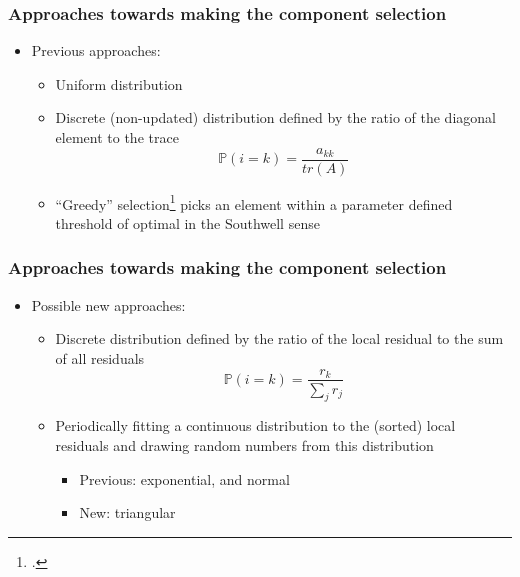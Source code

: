 \documentclass{beamer}
\begin{document}
\begin{frame}
	\frametitle{Approaches towards making the component selection}
	\begin{itemize}
		\item Previous approaches:
		    \begin{itemize}
		        \item Uniform distribution
		        \item Discrete (non-updated) distribution defined by the ratio of the diagonal element to the trace
		            \begin{equation}
		                \mathbb{P}(i=k) = \frac{a_{kk}}{tr(A)}
		            \end{equation}
		        \item ``Greedy'' selection\footcite{griebel2012greedy} picks an element within a parameter defined threshold of optimal in the Southwell sense 
		    \end{itemize}
	\end{itemize}
\end{frame}


\begin{frame}
	\frametitle{Approaches towards making the component selection}
	\begin{itemize}
		\item Possible new approaches:
		    \begin{itemize}
		        \item Discrete distribution defined by the ratio of the local residual to the sum of all residuals
		            \begin{equation}
		                \mathbb{P}(i=k) = \frac{r_{k}}{\sum_j r_j}
		            \end{equation}
		        \item Periodically fitting a continuous distribution to the (sorted) local residuals and drawing random numbers from this distribution
		            \begin{itemize}
		                \item Previous: exponential, and normal
		                \item New: triangular
		            \end{itemize}
		    \end{itemize}
	\end{itemize}
\end{frame}

\end{document}
